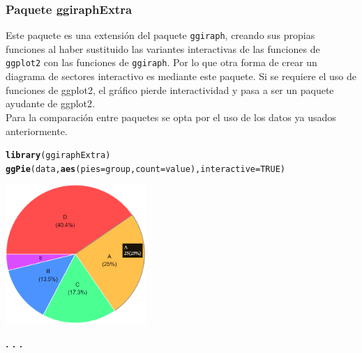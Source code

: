 \documentclass{article}\usepackage[]{graphicx}\usepackage[]{color}
\makeatletter
\newcommand{\hlnum}[1]{\textcolor[rgb]{0.686,0.059,0.569}{#1}}%
\newcommand{\hlstd}[1]{\textcolor[rgb]{0.345,0.345,0.345}{#1}}%
\newcommand{\hlkwc}[1]{\textcolor[rgb]{0.333,0.667,0.333}{#1}}%
\newcommand{\hlkwd}[1]{\textcolor[rgb]{0.737,0.353,0.396}{\textbf{#1}}}%
\newenvironment{kframe}{%
 \def\at@end@of@kframe{}%
 \ifinner\ifhmode%
  \def\at@end@of@kframe{\end{minipage}}%
  \begin{minipage}{\columnwidth}%
 \fi\fi%
 \def\FrameCommand##1{\hskip\@totalleftmargin \hskip-\fboxsep
 \colorbox{shadecolor}{##1}\hskip-\fboxsep
     \hskip-\linewidth \hskip-\@totalleftmargin \hskip\columnwidth}%
 \MakeFramed {\advance\hsize-\width
   \@totalleftmargin\z@ \linewidth\hsize
   \@setminipage}}%
 {\par\unskip\endMakeFramed%
 \at@end@of@kframe}
\newenvironment{knitrout}{}{} %
\makeatother
\begin{document}
\subsubsection{Paquete ggiraphExtra}
Este paquete \cite{docu_ggiraphExtra} 
es una extensi\'on del paquete \texttt{ggiraph}, creando sus propias funciones al haber sustituido las variantes interactivas de las funciones de \texttt{ggplot2} con las funciones de \texttt{ggiraph}. Por lo que otra forma de crear un diagrama de sectores interactivo es mediante este paquete. Si se requiere el uso de funciones de ggplot2, el gr\'afico pierde interactividad y pasa a ser un paquete ayudante de ggplot2.~\\
Para la comparaci\'on entre paquetes se opta por el uso de los datos ya usados anteriormente. 
\begin{knitrout}
\color{fgcolor}\begin{kframe}
\begin{alltt}
\hlkwd{library}\hlstd{(ggiraphExtra)}
\hlkwd{ggPie}\hlstd{(data,} \hlkwd{aes}\hlstd{(} \hlkwc{pies}\hlstd{=group,} \hlkwc{count}\hlstd{=value),} \hlkwc{interactive} \hlstd{=} \hlnum{TRUE}\hlstd{)}
\end{alltt}
\end{kframe}
\end{knitrout}
\vbox{
    \centering
    \includegraphics[width=0.4\textwidth]{imag/pir_ggiraph}
}
\begin{center}
\textbf{. . .}
\end{center}
\end{document}
